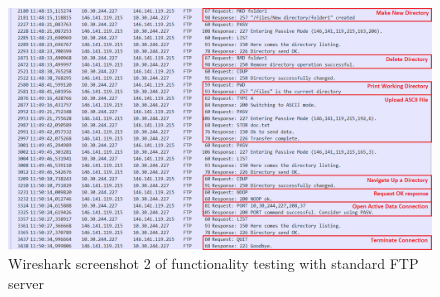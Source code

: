 \documentclass[10pt,twocolumn]{witseiepaper}
\begin{document}
\begin{appendix}
\begin{figure}[h]
\centering
\includegraphics[width=0.9\columnwidth]{WitsServerCapture2.png}
\caption{Wireshark screenshot 2 of functionality testing with standard FTP server}
\raggedright
\label{fig:WitsWS2}
\end{figure}

\newpage



\end{appendix} 	

\end{document}
